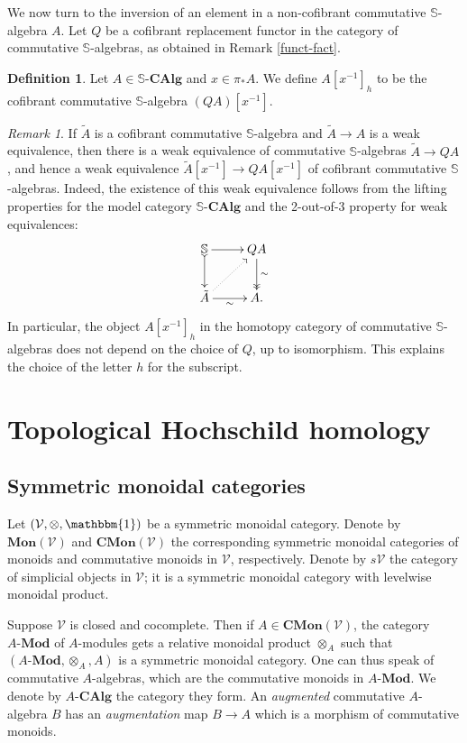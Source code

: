 \documentclass[a4paper,11pt]{amsart} %
\theoremstyle{definition} \newtheorem{defn}[equation]{Definition}
\theoremstyle{remark} \newtheorem{notation}[equation]{Notation}
\theoremstyle{plain} \newtheorem{teo}[equation]{Theorem}
\theoremstyle{plain} \newtheorem{lema}[equation]{Lemma}
\theoremstyle{plain} \newtheorem{prop}[equation]{Proposition}
\theoremstyle{plain} \newtheorem{corolario}[equation]{Corollary}
\theoremstyle{remark} \newtheorem{obs}[equation]{Remark}
\theoremstyle{remark} \newtheorem{sideobs}[equation]{Side remark}
\theoremstyle{remark} \newtheorem{ejercicio}[equation]{Exercise}
\theoremstyle{definition} \newtheorem{notn}[equation]{Notation}
\theoremstyle{remark} \newtheorem{ej}[equation]{Example}
\theoremstyle{remark} \newtheorem{contraej}[equation]{Counterexample}
\theoremstyle{plain} \newtheorem{conj}[equation]{Conjecture}
\renewcommand{\1}{\ensuremath{\mathbbm{1}}}
\newcommand{\V}{\mathcal{V}}
\renewcommand{\S}{\mathbb{S}}
\newcommand{\bdefn}{\begin{defn}}
\newcommand{\edefn}{\end{defn}}
\newcommand{\bobs}{\begin{obs}}
\newcommand{\eobs}{\end{obs}}
\newcommand{\Mon}{\ensuremath{\mathbf{Mon}}}
\newcommand{\CMon}{\ensuremath{\mathbf{CMon}}}
\newcommand{\Mod}{\mbox{-}\mathbf{Mod}}
\newcommand{\SCAlg}{\ensuremath{\mathbb{S}}\mbox{-}\ensuremath{\mathbf{CAlg}}}
\newcommand{\ACAlg}{\ensuremath{A}\mbox{-}\ensuremath{\mathbf{CAlg}}}
\numberwithin{equation}{section}
\begin{document}
We now turn to the inversion of an element in a non-cofibrant commutative $\S$-algebra $A$. Let $Q$ be a cofibrant replacement functor in the category of commutative $\S$-algebras, as obtained in Remark \ref{funct-fact}.%
%

\bdefn \label{def-nocof} Let $A\in \SCAlg$ and $x\in \pi_*A$. We define $A[x^{-1}]_h$ to be the cofibrant commutative $\S$-algebra $(QA)[x^{-1}]$.
\edefn

\bobs \label{lifto} If $\tilde A$ is a cofibrant commutative $\S$-algebra and $\tilde A\to A$ is a weak equivalence, then there is a weak equivalence of commutative $\S$-algebras $\tilde A\to QA$, and hence a weak equivalence $\tilde A[x^{-1}]\to QA[x^{-1}]$ of cofibrant commutative $\S$-algebras. Indeed, the existence of this weak equivalence follows from the lifting properties for the model category $\SCAlg$ and the 2-out-of-3 property for weak equivalences:
\[\xymatrix{\S \ar[r] \ar@{>->}[d] & QA \ar@{->>}[d]^-{\sim} \\ \tilde A \ar@{.>}[ru] \ar[r]_-\sim & A.}\]
In particular, the object $A[x^{-1}]_h$ in the homotopy category of commutative $\S$-algebras does not depend on the choice of $Q$, up to isomorphism. This explains the choice of the letter $h$ for the subscript.
\eobs



%
%
%
%
%
%
%




%


\section{Topological Hochschild homology} \label{sect-thh}

\subsection{Symmetric monoidal categories} 
Let $(\V,\otimes, \1)$ be a symmetric monoidal category. Denote by $\Mon(\V)$ and $\CMon(\V)$ the corresponding symmetric monoidal categories of monoids and commutative monoids in $\V$, respectively. Denote by $s\V$ the category of simplicial objects in $\V$; it is a symmetric monoidal category with levelwise monoidal product.

Suppose $\V$ is closed and cocomplete. Then if $A\in \CMon(\V)$, the category $A\Mod$ of $A$-modules gets a relative monoidal product $\otimes_A$ such that $(A\Mod, \otimes_A, A)$ is a symmetric monoidal category. One can thus speak of commutative $A$-algebras, which are the commutative monoids in $A\Mod$. We denote by $\ACAlg$ the category they form. %
An \emph{augmented} commutative $A$-algebra $B$ has an \emph{augmentation} map $B\to A$ which is a morphism of commutative monoids.
\end{document}
